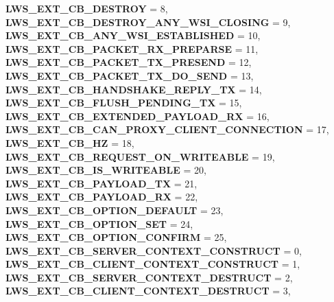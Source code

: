 \begin{DoxyCompactItemize}
{\bfseries L\+W\+S\+\_\+\+E\+X\+T\+\_\+\+C\+B\+\_\+\+D\+E\+S\+T\+R\+OY} = 8, 
{\bfseries L\+W\+S\+\_\+\+E\+X\+T\+\_\+\+C\+B\+\_\+\+D\+E\+S\+T\+R\+O\+Y\+\_\+\+A\+N\+Y\+\_\+\+W\+S\+I\+\_\+\+C\+L\+O\+S\+I\+NG} = 9, 
\newline
{\bfseries L\+W\+S\+\_\+\+E\+X\+T\+\_\+\+C\+B\+\_\+\+A\+N\+Y\+\_\+\+W\+S\+I\+\_\+\+E\+S\+T\+A\+B\+L\+I\+S\+H\+ED} = 10, 
{\bfseries L\+W\+S\+\_\+\+E\+X\+T\+\_\+\+C\+B\+\_\+\+P\+A\+C\+K\+E\+T\+\_\+\+R\+X\+\_\+\+P\+R\+E\+P\+A\+R\+SE} = 11, 
{\bfseries L\+W\+S\+\_\+\+E\+X\+T\+\_\+\+C\+B\+\_\+\+P\+A\+C\+K\+E\+T\+\_\+\+T\+X\+\_\+\+P\+R\+E\+S\+E\+ND} = 12, 
{\bfseries L\+W\+S\+\_\+\+E\+X\+T\+\_\+\+C\+B\+\_\+\+P\+A\+C\+K\+E\+T\+\_\+\+T\+X\+\_\+\+D\+O\+\_\+\+S\+E\+ND} = 13, 
\newline
{\bfseries L\+W\+S\+\_\+\+E\+X\+T\+\_\+\+C\+B\+\_\+\+H\+A\+N\+D\+S\+H\+A\+K\+E\+\_\+\+R\+E\+P\+L\+Y\+\_\+\+TX} = 14, 
{\bfseries L\+W\+S\+\_\+\+E\+X\+T\+\_\+\+C\+B\+\_\+\+F\+L\+U\+S\+H\+\_\+\+P\+E\+N\+D\+I\+N\+G\+\_\+\+TX} = 15, 
{\bfseries L\+W\+S\+\_\+\+E\+X\+T\+\_\+\+C\+B\+\_\+\+E\+X\+T\+E\+N\+D\+E\+D\+\_\+\+P\+A\+Y\+L\+O\+A\+D\+\_\+\+RX} = 16, 
{\bfseries L\+W\+S\+\_\+\+E\+X\+T\+\_\+\+C\+B\+\_\+\+C\+A\+N\+\_\+\+P\+R\+O\+X\+Y\+\_\+\+C\+L\+I\+E\+N\+T\+\_\+\+C\+O\+N\+N\+E\+C\+T\+I\+ON} = 17, 
\newline
{\bfseries L\+W\+S\+\_\+\+E\+X\+T\+\_\+\+C\+B\+\_\+HZ} = 18, 
{\bfseries L\+W\+S\+\_\+\+E\+X\+T\+\_\+\+C\+B\+\_\+\+R\+E\+Q\+U\+E\+S\+T\+\_\+\+O\+N\+\_\+\+W\+R\+I\+T\+E\+A\+B\+LE} = 19, 
{\bfseries L\+W\+S\+\_\+\+E\+X\+T\+\_\+\+C\+B\+\_\+\+I\+S\+\_\+\+W\+R\+I\+T\+E\+A\+B\+LE} = 20, 
{\bfseries L\+W\+S\+\_\+\+E\+X\+T\+\_\+\+C\+B\+\_\+\+P\+A\+Y\+L\+O\+A\+D\+\_\+\+TX} = 21, 
\newline
{\bfseries L\+W\+S\+\_\+\+E\+X\+T\+\_\+\+C\+B\+\_\+\+P\+A\+Y\+L\+O\+A\+D\+\_\+\+RX} = 22, 
{\bfseries L\+W\+S\+\_\+\+E\+X\+T\+\_\+\+C\+B\+\_\+\+O\+P\+T\+I\+O\+N\+\_\+\+D\+E\+F\+A\+U\+LT} = 23, 
{\bfseries L\+W\+S\+\_\+\+E\+X\+T\+\_\+\+C\+B\+\_\+\+O\+P\+T\+I\+O\+N\+\_\+\+S\+ET} = 24, 
{\bfseries L\+W\+S\+\_\+\+E\+X\+T\+\_\+\+C\+B\+\_\+\+O\+P\+T\+I\+O\+N\+\_\+\+C\+O\+N\+F\+I\+RM} = 25, 
\newline
{\bfseries L\+W\+S\+\_\+\+E\+X\+T\+\_\+\+C\+B\+\_\+\+S\+E\+R\+V\+E\+R\+\_\+\+C\+O\+N\+T\+E\+X\+T\+\_\+\+C\+O\+N\+S\+T\+R\+U\+CT} = 0, 
{\bfseries L\+W\+S\+\_\+\+E\+X\+T\+\_\+\+C\+B\+\_\+\+C\+L\+I\+E\+N\+T\+\_\+\+C\+O\+N\+T\+E\+X\+T\+\_\+\+C\+O\+N\+S\+T\+R\+U\+CT} = 1, 
{\bfseries L\+W\+S\+\_\+\+E\+X\+T\+\_\+\+C\+B\+\_\+\+S\+E\+R\+V\+E\+R\+\_\+\+C\+O\+N\+T\+E\+X\+T\+\_\+\+D\+E\+S\+T\+R\+U\+CT} = 2, 
{\bfseries L\+W\+S\+\_\+\+E\+X\+T\+\_\+\+C\+B\+\_\+\+C\+L\+I\+E\+N\+T\+\_\+\+C\+O\+N\+T\+E\+X\+T\+\_\+\+D\+E\+S\+T\+R\+U\+CT} = 3, 

\end{DoxyCompactItemize}

